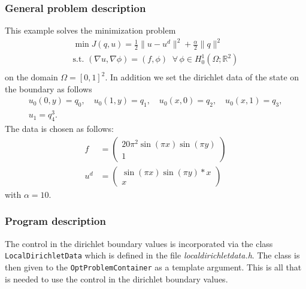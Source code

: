 \subsubsection{General problem description}
This example solves the minimization problem
\begin{gather*}
\min J(q,u) = \frac{1}{2} \|u-u^d\|^2 + \frac{\alpha}{2}\|q\|^2\\
\text{s.t. } (\nabla u,\nabla \phi) = (f,\phi)\;\;\forall\,\phi \in H^1_0(\Omega; \mathbb R^2)\\
\end{gather*}
on the domain $\Omega = [0,1]^2$. In addition we set the dirichlet data of the state on the boundary as follows
\begin{gather*}
 u_0(0,y) = q_0,\quad u_0(1,y) = q_1,\quad u_0(x,0) = q_2,\quad u_0(x,1) = q_3,\\
 u_1 = q_4^3.
\end{gather*}
The data is chosen as follows:
\begin{align*}
 f &= \left(\begin{matrix}20\pi^2  \sin( \pi x) \sin(\pi y)\\1 \end{matrix}\right)\\
 u^d&= \left(\begin{matrix}\sin( \pi x) \sin(\pi y)*x\\x \end{matrix}\right)
\end{align*}
with $\alpha = 10$.
\subsubsection{Program description}
The control in the dirichlet boundary values is incorporated via the
class \texttt{LocalDirichletData} which is defined in the
file \textit{localdirichletdata.h}. The class is then given to
the \texttt{OptProblemContainer} as a template argument. This is all that is
needed to use the control in the dirichlet boundary values. 
